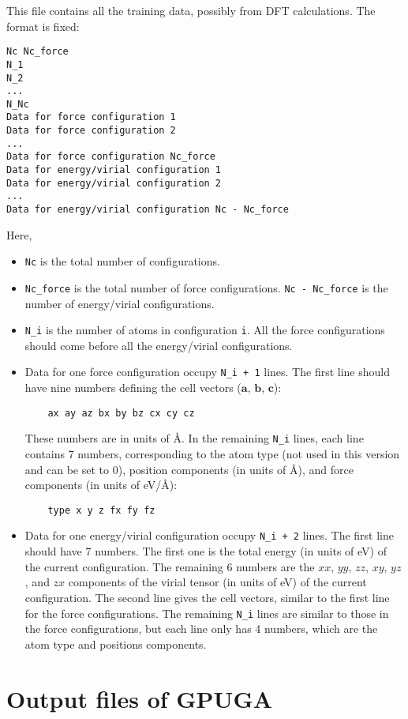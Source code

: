 \documentclass[12pt,a4paper]{report}
\newcommand{\vect}[1]{\boldsymbol{#1}}
\begin{document}
This file contains all the training data, possibly from DFT calculations. The format is fixed:
\begin{verbatim}
Nc Nc_force
N_1
N_2
...
N_Nc
Data for force configuration 1
Data for force configuration 2
...
Data for force configuration Nc_force
Data for energy/virial configuration 1
Data for energy/virial configuration 2
...
Data for energy/virial configuration Nc - Nc_force
\end{verbatim}
Here, 
\begin{itemize}
\item \verb"Nc" is the total number of configurations.
\item \verb"Nc_force" is the total number of force configurations. \verb"Nc - Nc_force" is the number of energy/virial configurations.
\item \verb"N_i" is the number of atoms in configuration \verb"i". All the force configurations should come before all the energy/virial configurations.
\item Data for one force configuration occupy \verb"N_i + 1" lines. The first line should have nine numbers defining the cell vectors ($\vect{a}$, $\vect{b}$, $\vect{c}$):
\begin{verbatim}
    ax ay az bx by bz cx cy cz
\end{verbatim} 
These numbers are in units of \AA. In the remaining \verb"N_i" lines, each line contains 7 numbers, corresponding to the atom type (not used in this version and can be set to 0), position components (in units of \AA), and force components (in units of eV/\AA):
\begin{verbatim}
    type x y z fx fy fz
\end{verbatim} 
\item Data for one energy/virial configuration occupy \verb"N_i + 2" lines. The first line should have 7 numbers. The first one is the total energy (in units of eV) of the current configuration. The remaining 6 numbers are the $xx$, $yy$, $zz$, $xy$, $yz$, and $zx$ components of the virial tensor (in units of eV) of the current configuration. The second line gives the cell vectors, similar to the first line for the force configurations. The remaining \verb"N_i" lines are similar to those in the force configurations, but each line only has 4 numbers, which are the atom type and positions components.
\end{itemize}


\section{Output files of GPUGA}
\end{document}
